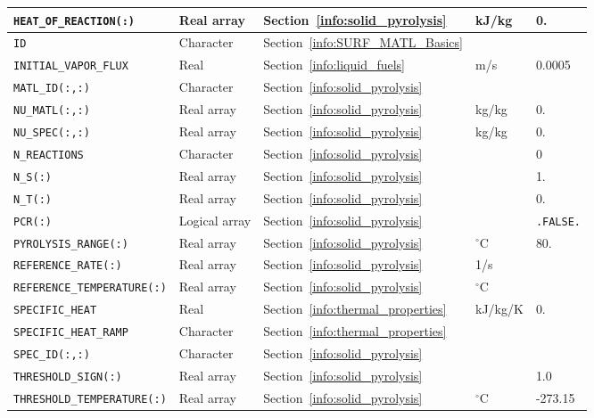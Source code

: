 \documentclass[11pt]{book}
\newcommand{\ct}{\tt\small}
\begin{document}
\begin{longtable}{@{\extracolsep{\fill}}|l|l|l|l|l|}
{\ct HEAT\_OF\_REACTION(:)}         & Real array    & Section~\ref{info:solid_pyrolysis}    & kJ/kg             & 0.     \\ \hline
{\ct ID     }                       & Character     & Section~\ref{info:SURF_MATL_Basics}   &                   &        \\ \hline
{\ct INITIAL\_VAPOR\_FLUX}          & Real          & Section~\ref{info:liquid_fuels}       & m/s               & 0.0005 \\ \hline
{\ct MATL\_ID(:,:)}                 & Character     & Section~\ref{info:solid_pyrolysis}    &                   &        \\ \hline
{\ct NU\_MATL(:,:)}                 & Real array    & Section~\ref{info:solid_pyrolysis}    & kg/kg             & 0.     \\ \hline
{\ct NU\_SPEC(:,:)}                 & Real array    & Section~\ref{info:solid_pyrolysis}    & kg/kg             & 0.     \\ \hline
{\ct N\_REACTIONS}                  & Character     & Section~\ref{info:solid_pyrolysis}    &                   & 0      \\ \hline
{\ct N\_S(:)}                       & Real array    & Section~\ref{info:solid_pyrolysis}    &                   & 1.     \\ \hline
{\ct N\_T(:)}                       & Real array    & Section~\ref{info:solid_pyrolysis}    &                   & 0.     \\ \hline
{\ct PCR(:)}                        & Logical array & Section~\ref{info:solid_pyrolysis}    &                   & {\ct.FALSE.}\\ \hline
{\ct PYROLYSIS\_RANGE(:)}           & Real array    & Section~\ref{info:solid_pyrolysis}    & $^\circ$C         & 80.    \\ \hline
{\ct REFERENCE\_RATE(:)}            & Real array    & Section~\ref{info:solid_pyrolysis}    & 1/s               &        \\ \hline
{\ct REFERENCE\_TEMPERATURE(:)}     & Real array    & Section~\ref{info:solid_pyrolysis}    & $^\circ$C         &        \\ \hline
{\ct SPECIFIC\_HEAT}                & Real          & Section~\ref{info:thermal_properties} & kJ/kg/K           & 0.     \\ \hline
{\ct SPECIFIC\_HEAT\_RAMP}          & Character     & Section~\ref{info:thermal_properties} &                   &        \\ \hline
{\ct SPEC\_ID(:,:)}                 & Character     & Section~\ref{info:solid_pyrolysis}    &                   &        \\ \hline
{\ct THRESHOLD\_SIGN(:)}            & Real array    & Section~\ref{info:solid_pyrolysis}    &                   & 1.0    \\ \hline
{\ct THRESHOLD\_TEMPERATURE(:)}     & Real array    & Section~\ref{info:solid_pyrolysis}    & $^\circ$C         & -273.15 \\ \hline
\end{longtable}
\end{document}
